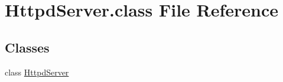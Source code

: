\hypertarget{HttpdServer_8class}{\section{Httpd\-Server.\-class File Reference}
\label{HttpdServer_8class}
}
\subsection*{Classes}
\begin{DoxyCompactItemize}
\item 
class \hyperlink{classHttpdServer}{Httpd\-Server}
\end{DoxyCompactItemize}
